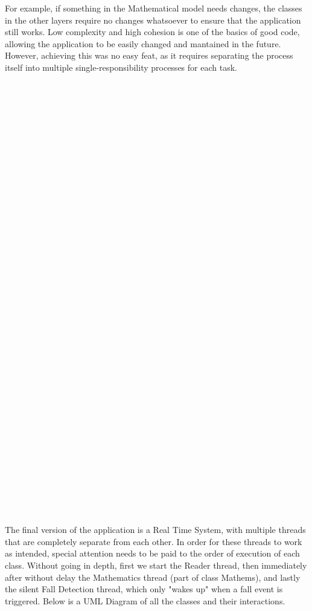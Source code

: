 \documentclass[hidelinks,conference,12pt]{IEEETran}
\begin{document}
 For example, if something in the Mathematical model needs changes, the classes in the other layers require no changes whatsoever to ensure that the application still works. Low complexity and high cohesion is one of the basics of good code, allowing the application to be easily changed and mantained in the future. However, achieving this was no easy feat, as it requires separating the process itself into multiple single-responsibility processes for each task. \\\\\\\\\\\\\\\\\\\\\\\\\\\\\\\\\\\\\\\\\\\\\\\\\\\\\\\\\\\\\\\\\\\\\\\\\\\\\\
 The final version of the application is a Real Time System, with multiple threads that are completely separate from each other. In order for these threads to work as intended, special attention needs to be paid to the order of execution of each class. Without going in depth, first we start the Reader thread, then immediately after without delay the Mathematics thread (part of class Mathems), and lastly the silent Fall Detection thread, which only "wakes up" when a fall event is triggered.
Below is a UML Diagram of all the classes and their interactions.
\end{document}
